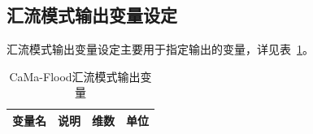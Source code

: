 \documentclass[a4paper,12pt,twoside]{article}
\begin{document}
\subsection{汇流模式输出变量设定}
汇流模式输出变量设定主要用于指定输出的变量，详见表~\ref{CaMa-Flood汇流模式输出变量}。
\begin{table}[htbp]
\centering \renewcommand{\arraystretch}{1.5}
\caption{CaMa-Flood汇流模式输出变量}
\label{CaMa-Flood汇流模式输出变量}
\begin{tabular}{lp{}ll}
\toprule
\textbf{变量名} & \textbf{说明} & \textbf{维数} & \textbf{单位} \\ \midrule 


\end{tabular}
\end{table}
\end{document}
